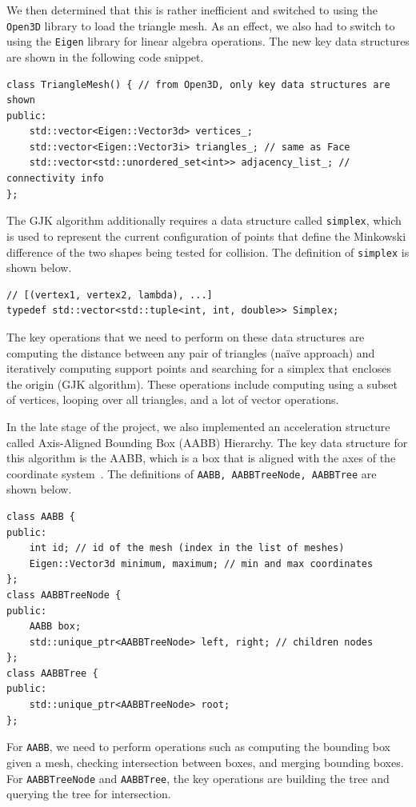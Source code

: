 \documentclass[12pt,fleqn]{article}
\newcommand{\code}[1]{\texttt{#1}}
\begin{document}
We then determined that this is rather inefficient and switched to using the \code{Open3D} library to load the triangle mesh.
As an effect, we also had to switch to using the \code{Eigen} library for linear algebra operations.
The new key data structures are shown in the following code snippet.
\begin{verbatim}
class TriangleMesh() { // from Open3D, only key data structures are shown
public:
    std::vector<Eigen::Vector3d> vertices_;
    std::vector<Eigen::Vector3i> triangles_; // same as Face
    std::vector<std::unordered_set<int>> adjacency_list_; // connectivity info
};
\end{verbatim}

The GJK algorithm additionally requires a data structure called \code{simplex}, which is used to represent the current configuration of points that define the Minkowski difference of the two shapes being tested for collision.
The definition of \code{simplex} is shown below.
\begin{verbatim}
// [(vertex1, vertex2, lambda), ...]
typedef std::vector<std::tuple<int, int, double>> Simplex;
\end{verbatim}

The key operations that we need to perform on these data structures are computing the distance between any pair of triangles (naïve approach) and iteratively computing support points and searching for a simplex that encloses the origin (GJK algorithm).
These operations include computing using a subset of vertices, looping over all triangles, and a lot of vector operations.

In the late stage of the project, we also implemented an acceleration structure called Axis-Aligned Bounding Box (AABB) Hierarchy.
The key data structure for this algorithm is the AABB, which is a box that is aligned with the axes of the coordinate system~\cite{wikipedia_mbb,wikipedia_bvh}.
The definitions of \code{AABB, AABBTreeNode, AABBTree} are shown below.
\begin{verbatim}
class AABB {
public:
    int id; // id of the mesh (index in the list of meshes)
    Eigen::Vector3d minimum, maximum; // min and max coordinates
};
class AABBTreeNode {
public:
    AABB box;
    std::unique_ptr<AABBTreeNode> left, right; // children nodes
};
class AABBTree {
public:
    std::unique_ptr<AABBTreeNode> root;
};
\end{verbatim}

For \code{AABB}, we need to perform operations such as computing the bounding box given a mesh, checking intersection between boxes, and merging bounding boxes.
For \code{AABBTreeNode} and \code{AABBTree}, the key operations are building the tree and querying the tree for intersection.
\end{document}
